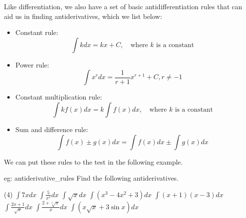 \newpage
Like differentiation, we also have a set of basic antidifferentiation rules that can aid us in finding antiderivatives, which we list below:

\begin{itemize}
    \item Constant rule:
    \[\int k dx = kx + C, \quad \text{where }k\text{ is a constant}\]
    \item Power rule:
    \[\int x^r dx = \frac{1}{r+1}x^{r+1} + C, r \ne -1\]
    \item Constant multiplication rule:
    \[\int kf(x) dx = k\int f(x) dx, \quad \text{where }k\text{ is a constant}\]
    \item Sum and difference rule:
    \[\int f(x) \pm g(x) dx = \int f(x) dx \pm \int g(x) dx\]
\end{itemize}

We can put these rules to the test in the following example.

\bigskip

\begin{eg}[]{eg: antiderivative_rules}
    Find the following antiderivatives.
    \begin{tasks}(4)
        \task $\int 7x dx$
        \task $\int \frac{5}{x^4} dx$
        \task $\int \sqrt{x} dx$
        \task $\int (x^3 - 4x^2 + 3) dx$
        \task $\int (x+1)(x-3) dx$
        \task $\int \frac{2x + 1}{\sqrt{x}} dx$
        \task $\int \frac{2+\sqrt[5]{x}}{x} dx$ 
        \task $\int (x\sqrt{x} + 3\sin x) dx$
    \end{tasks}
\end{eg}

